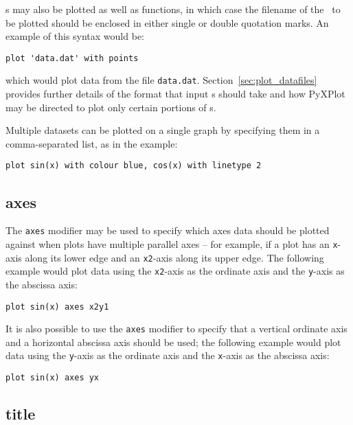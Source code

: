 \Datafile s may also be plotted as well as functions, in which case the
filename of the \datafile\ to be plotted should be enclosed in either single or
double quotation marks. An example of this syntax would be:

\begin{verbatim}
plot 'data.dat' with points
\end{verbatim}

\noindent which would plot data from the file {\tt data.dat}.
Section~\ref{sec:plot_datafiles} provides further details of the format that
input \datafile s should take and how PyXPlot may be directed to plot only
certain portions of \datafile s.

Multiple datasets can be plotted on a single graph by specifying them in a
comma-separated list, as in the example:

\begin{verbatim}
plot sin(x) with colour blue, cos(x) with linetype 2
\end{verbatim}


\subsection{axes}

The {\tt axes} modifier may be used to specify which axes data should be
plotted against when plots have multiple parallel axes -- for example, if a
plot has an {\tt x}-axis along its lower edge and an {\tt x2}-axis along its
upper edge. The following example would plot data using the {\tt x2}-axis as
the ordinate axis and the {\tt y}-axis as the abscissa axis:

\begin{verbatim}
plot sin(x) axes x2y1
\end{verbatim}

\noindent It is also possible to use the {\tt axes} modifier to specify that a
vertical ordinate axis and a horizontal abscissa axis should be used; the
following example would plot data using the {\tt y}-axis as the ordinate axis
and the {\tt x}-axis as the abscissa axis:

\begin{verbatim}
plot sin(x) axes yx
\end{verbatim}


\subsection{title}

